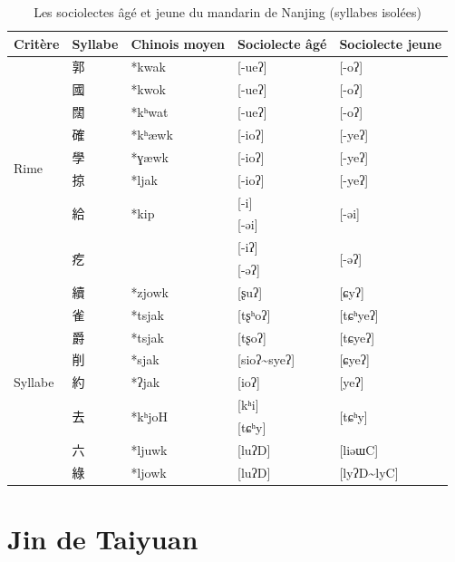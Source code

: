 \documentclass{scrbook}
\newcounter{c}[subsubsection]
\newcommand{\bolang}{\textasciitilde}
\newcommand{\diflaoxin}{sociolectes âgé et jeune\xspace}
\newcommand{\iso}{syllabes isolées\xspace}
\begin{document}
\begin{sloppypar}
\begin{table}[htbp]
  \centering
    \begin{tabular}{lllll}
    \toprule
    Critère & Syllabe & Chinois moyen  & Sociolecte âgé & Sociolecte jeune \\
    \midrule
    \multirow{10}[2]{*}{Rime} & 郭     & *kwak & [-ueʔ] & [-oʔ] \\
          & 國     & *kwok & [-ueʔ] & [-oʔ] \\
          & 闊     & *kʰwat & [-ueʔ] & [-oʔ] \\
          & 確     & *kʰæwk & [-ioʔ] & [-yeʔ] \\
          & 學     & *ɣæwk & [-ioʔ] & [-yeʔ] \\
          & 掠     & *ljak & [-ioʔ] & [-yeʔ] \\
          & \multirow{2}[0]{*}{給} & \multirow{2}[0]{*}{*kip} & [-i]  & \multirow{2}[0]{*}{[-əi]} \\
          &       &       & [-əi] &  \\
          & \multirow{2}[1]{*}{疙} & \multirow{2}[1]{*}{} & [-iʔ] & \multirow{2}[1]{*}{[-əʔ]} \\
          &       &       & [-əʔ] &  \\
    \midrule
    \multirow{9}[2]{*}{Syllabe} & 續     & *zjowk & [ʂuʔ] & [ɕyʔ] \\
          & 雀     & *tsjak & [tʂʰoʔ] & [tɕʰyeʔ] \\
          & 爵     & *tsjak & [tʂoʔ] & [tɕyeʔ] \\
          & 削     & *sjak & [sioʔ\bolang syeʔ] & [ɕyeʔ] \\
          & 約     & *ʔjak & [ioʔ] & [yeʔ] \\
          & \multirow{2}[0]{*}{去} & \multirow{2}[0]{*}{*kʰjoH} & [kʰi] & \multirow{2}[0]{*}{[tɕʰy]} \\
          &       &       & [tɕʰy] &  \\
          & 六     & *ljuwk & [luʔD] & [liəɯC] \\
          & 綠     & *ljowk & [luʔD] & [lyʔD\bolang lyC] \\
    \bottomrule
    \end{tabular}%
  \caption{Les \diflaoxin du mandarin de Nanjing (\iso)}
  \label{tab:Nanjing2iso}%
\end{table}%

\section{Jin de Taiyuan}


\end{sloppypar}
\end{document}
